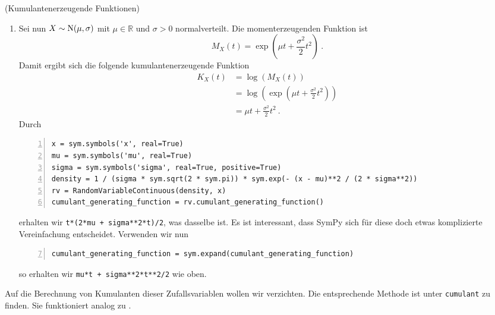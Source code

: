 \begin{Beispiel}{(Kumulantenerzeugende Funktionen)}
\begin{enumerate}[label=(\roman*)]
\item Sei nun $X \sim \operatorname{N}(\mu, \sigma)$ mit $\mu \in \mathbb{R}$ und $\sigma > 0$ normalverteilt. Die momenterzeugenden Funktion ist
\[M_X(t) = \exp\left( \mu t + \frac{\sigma^2}{2} t^2 \right)~.\]
Damit ergibt sich die folgende kumulantenerzeugende Funktion
\begin{align*}
K_X(t) &= \log(M_X(t))\\
&= \log\left( \exp\left( \mu t + \frac{\sigma^2}{2} t^2 \right) \right)\\
&= \mu t + \frac{\sigma^2}{2} t^2~.
\end{align*}
Durch
\begin{lstlisting}[numbers=left, numberstyle=\tiny\color{codegray}]
x = sym.symbols('x', real=True)
mu = sym.symbols('mu', real=True)
sigma = sym.symbols('sigma', real=True, positive=True)
density = 1 / (sigma * sym.sqrt(2 * sym.pi)) * sym.exp(- (x - mu)**2 / (2 * sigma**2))
rv = RandomVariableContinuous(density, x)
cumulant_generating_function = rv.cumulant_generating_function()
\end{lstlisting}
erhalten wir \lstinline|t*(2*mu + sigma**2*t)/2|, was dasselbe ist. Es ist interessant, dass SymPy sich für diese doch etwas komplizierte Vereinfachung entscheidet. Verwenden wir nun
\begin{lstlisting}[numbers=left, numberstyle=\tiny\color{codegray}, firstnumber=7]
cumulant_generating_function = sym.expand(cumulant_generating_function)
\end{lstlisting}
so erhalten wir \lstinline|mu*t + sigma**2*t**2/2| wie oben.
\end{enumerate}
Auf die Berechnung von Kumulanten dieser Zufallsvariablen wollen wir verzichten. Die entsprechende Methode ist unter \lstinline|cumulant| zu finden. Sie funktioniert analog zu \hyperlink{Code:n_Moment_Generating}{}.
\end{Beispiel}

\vspace*{-\medskipamount}